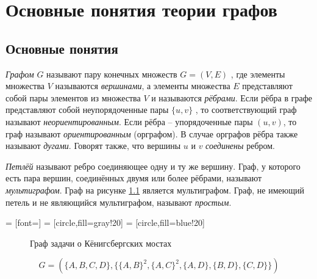 
\chapter{Основные понятия теории графов}

\section{Основные понятия}

\emph{Графом} $G$ называют пару конечных множеств $G=(V, E)$ , где 
элементы множества $V$ называются \emph{вершинами}, а элементы 
множества $E$ представляют собой пары элементов из множества $V$ и называются 
\emph{рёбрами}. Если рёбра в графе представляют собой 
неупорядоченные пары $\{u, v\}$ , то соответствующий граф называют 
\emph{неориентированным}. Если рёбра – упорядоченные пары $(u, v)$, то граф 
называют \emph{ориентированным} (орграфом). В случае орграфов рёбра также 
называют \emph{дугами}. Говорят также, что вершины $u$ и $v$ \emph{соединены} 
ребром.

\emph{Петлёй} называют ребро соединяющее одну и ту же вершину. Граф, у которого 
есть пара вершин, соединённых двумя или более рёбрами, называют 
\emph{мультиграфом}. Граф на рисунке \ref{the koenigsberg bridges} является 
мультиграфом. Граф, не имеющий петель и не являющийся мультиграфом,
называют \emph{простым}.

 = [font=\footnotesize]
 = [circle,fill=gray!20]
 = [circle,fill=blue!20]

\begin{figure}[h]
	\center
	\caption{Граф задачи о Кёнигсбергских мостах}
	\label{the koenigsberg bridges}
\end{figure}

\begin{equation}
G = (\{A,B,C,D\}, \{\{A,B\}^2,\{A,C\}^2,\{A,D\},\{B,D\},\{C,D\}\})
\end{equation}

